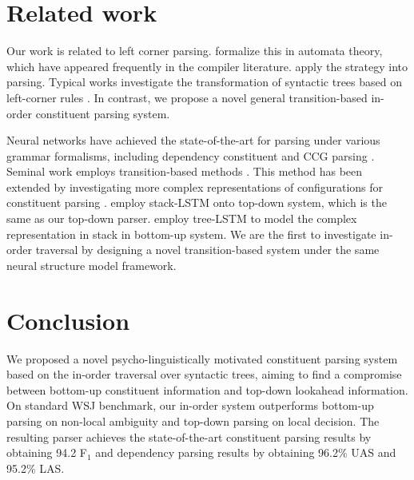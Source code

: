 \documentclass[11pt,letterpaper]{article}
\begin{document}
\section{Related work}
Our work is related to left corner parsing.
 formalize this in automata theory, which have appeared frequently in the compiler literature.
 apply the strategy into parsing. 
Typical works investigate the transformation of syntactic trees based on left-corner rules \cite{roark:2001,schuler:2010,van:2013}.
In contrast, we propose a novel general transition-based in-order constituent parsing system.
\begin{comment}
\newcite{noji:2014} propose left-corner dependency parsing, which is seminal work to propose a transition system for dependency parsing with a left-corner strategy. 
Their system is characterized by the rules that a node is enumerated when the subtree of its first child has been enumerated, and an arc is enumerated when the two nodes it connects have been enumerated.
They construct arcs with a dependency grammar, resulting a by-product of binarized trees.
In contrast, our constituent parsing system directly construct constituent trees without binarization.
Also, we realize the system on a neural transition-based parser, achieving the state-of-the-art results on constituent parsing, and dependency parsing by converting to Stanford dependency.
\end{comment}

Neural networks have achieved the state-of-the-art for parsing under various grammar formalisms, including dependency \cite{dozat:2017} constituent \cite{dyer:2016,kuncoro:2017} and CCG parsing \cite{xu:2016,lewis:2016}.
Seminal work employs transition-based methods \cite{chen:2014}.
This method has been extended by investigating more complex representations of configurations for constituent parsing \cite{watanabe:2015,dyer:2016}.
 employ stack-LSTM onto top-down system, which is the same as our top-down parser.
 employ tree-LSTM to model the complex representation in stack in bottom-up system.
We are the first to investigate in-order traversal by designing a novel transition-based system under the same neural structure model framework.


\section{Conclusion}
We proposed a novel psycho-linguistically motivated constituent parsing system based on the in-order traversal over syntactic trees, aiming to find a compromise between bottom-up constituent information and top-down lookahead information. 
On standard WSJ benchmark, our in-order system outperforms bottom-up parsing on non-local ambiguity and top-down parsing on local decision.
The resulting parser achieves the state-of-the-art constituent parsing results by obtaining 94.2 F$_1$ and dependency parsing results by obtaining 96.2\% UAS and 95.2\% LAS.
\end{document}
